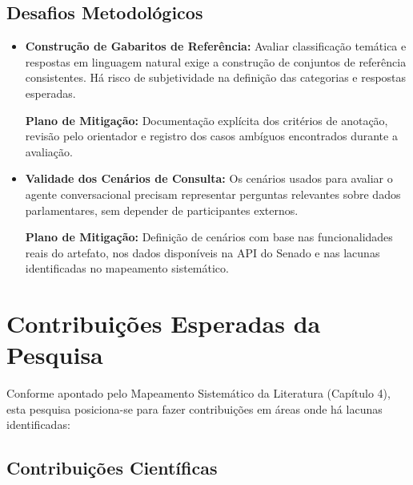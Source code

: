 \subsection{Desafios Metodológicos}

\begin{itemize}
    \item \textbf{Construção de Gabaritos de Referência:} Avaliar classificação temática e respostas em linguagem natural exige a construção de conjuntos de referência consistentes. Há risco de subjetividade na definição das categorias e respostas esperadas.

    \textbf{Plano de Mitigação:} Documentação explícita dos critérios de anotação, revisão pelo orientador e registro dos casos ambíguos encontrados durante a avaliação.

    \item \textbf{Validade dos Cenários de Consulta:} Os cenários usados para avaliar o agente conversacional precisam representar perguntas relevantes sobre dados parlamentares, sem depender de participantes externos.

    \textbf{Plano de Mitigação:} Definição de cenários com base nas funcionalidades reais do artefato, nos dados disponíveis na API do Senado e nas lacunas identificadas no mapeamento sistemático.
\end{itemize}

\section{Contribuições Esperadas da Pesquisa}

Conforme apontado pelo Mapeamento Sistemático da Literatura (Capítulo 4), esta pesquisa posiciona-se para fazer contribuições em áreas onde há lacunas identificadas:

\subsection{Contribuições Científicas}

